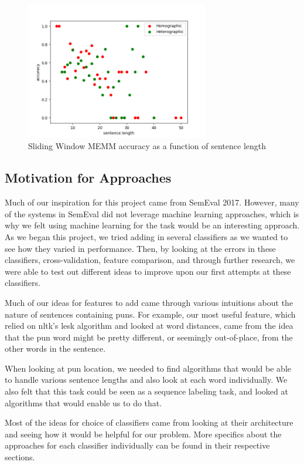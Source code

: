 \documentclass{article}
\begin{document}
\begin{figure}[h!]
    \centering
    \includegraphics[width=8cm]{figures/location-window.png}
	\caption{Sliding Window MEMM accuracy as a function of sentence length}
    \label{fig:method}
\end{figure}


\subsection{Motivation for Approaches}
Much of our inspiration for this project came from SemEval 2017. However, many of the systems in SemEval did not leverage machine learning approaches, which is why we felt using machine learning for the task would be an interesting approach. As we began this project, we tried adding in several classifiers as we wanted to see how they varied in performance. Then, by looking at the errors in these classifiers, cross-validation, feature comparison, and through further research, we were able to test out different ideas to  improve upon our first attempts at these classifiers. 

Much of our ideas for features to add came through various intuitions about the nature of sentences containing puns. For example, our most useful feature, which relied on nltk's lesk algorithm and looked at word distances, came from the idea that the pun word might be pretty different, or seemingly out-of-place, from the other words in the sentence.  

When looking at pun location, we needed to find algorithms that would be able to handle various sentence lengths and also look at each word individually. We also felt that this task could be seen as a sequence labeling task, and looked at algorithms that would enable us to do that. 

Most of the ideas for choice of classifiers came from looking at their architecture and seeing how it would be helpful for our problem. More specifics about the approaches for each classifier individually can be found in their respective sections.
\end{document}
